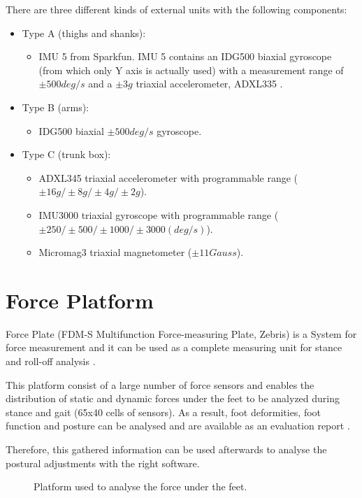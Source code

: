There are three different kinds of external units with the following components:
\begin{itemize}
	\item Type A (thighs and shanks): 
	\begin{itemize}
		\item IMU 5 from Sparkfun. IMU 5 contains an IDG500  biaxial gyroscope (from which only Y axis is actually used) with a measurement range of $\pm500deg/s$ and a $\pm3g$ triaxial accelerometer, ADXL335 .
	\end{itemize}
	\item Type B (arms):
	\begin{itemize}
		\item IDG500  biaxial $\pm500deg/s$ gyroscope.
	\end{itemize}
	\item Type C (trunk box):
	\begin{itemize}
		\item ADXL345  triaxial accelerometer with programmable range ($\pm16g/\pm8g/\pm4g/\pm2g$).
		\item IMU3000 triaxial gyroscope with programmable range ($\pm250/\pm500/\pm1000/\pm3000 (deg/s)$).
		\item Micromag3  triaxial magnetometer ($\pm11Gauss$).
	\end{itemize}
\end{itemize}


\section{Force Platform}
Force Plate (FDM-S Multifunction Force-measuring Plate, Zebris) is a System for force measurement and it can be used as a complete measuring unit for stance and roll-off analysis \cite{forceplate}.

This platform consist of a large number of force sensors and enables the distribution of static and dynamic forces under the feet to be analyzed during stance and gait (65x40 cells of sensors). As a result, foot deformities, foot function and posture can be analysed and are available as an evaluation report \cite{forceplate}.

Therefore, this gathered information can be used afterwards to analyse the postural adjustments with the right software.

\begin{figure}[H]
	\centering
	\caption{Platform used to analyse the force under the feet.}
	\label{fig:FDMS}
\end{figure}


